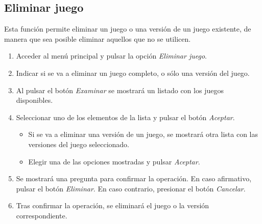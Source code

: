 \subsection{Eliminar juego}
Esta función permite eliminar un juego o una versión de un juego existente, de manera que sea posible eliminar aquellos que 
no se utilicen. \medskip

\begin{enumerate}
    \item Acceder al menú principal y pulsar la opción \textit{Eliminar juego}.
    \item Indicar si se va a eliminar un juego completo, o sólo una versión del juego.
    \item Al pulsar el botón \textit{Examinar} se mostrará un listado con los juegos disponibles.
    \item Seleccionar uno de los elementos de la lista y pulsar el botón \textit{Aceptar}.
    \begin{itemize}
        \item Si se va a eliminar una versión de un juego, se mostrará otra lista con las versiones 
        del juego seleccionado.
        \item Elegir una de las opciones mostradas y pulsar \textit{Aceptar}.
    \end{itemize}
    \item Se mostrará una pregunta para confirmar la operación. En caso afirmativo, pulsar el botón \textit{Eliminar}.
    En caso contrario, presionar el botón \textit{Cancelar}.
    \item Tras confirmar la operación, se eliminará el juego o la versión correspondiente.
\end{enumerate}
